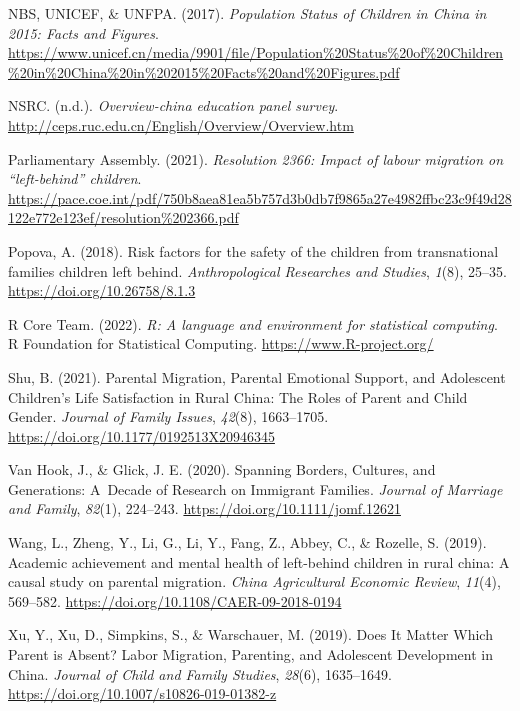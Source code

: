 \documentclass[
  man,floatsintext]{apa7}
\newlength{\cslhangindent}
\newlength{\cslentryspacingunit} %
\newenvironment{CSLReferences}[2] %
 {%
  \setlength{\parindent}{0pt}
  \ifodd #1
  \let\oldpar\par
  \def\par{\hangindent=\cslhangindent\oldpar}
  \fi
  \setlength{\parskip}{#2\cslentryspacingunit}
 }%
 {}
\begin{document}
\begin{CSLReferences}{1}{0}
\leavevmode{}%
NBS, UNICEF, \& UNFPA. (2017). \emph{Population Status of Children in China in 2015: Facts and Figures}. \url{https://www.unicef.cn/media/9901/file/Population\%20Status\%20of\%20Children\%20in\%20China\%20in\%202015\%20Facts\%20and\%20Figures.pdf}

\leavevmode{}%
NSRC. (n.d.). \emph{Overview-china education panel survey}. \url{http://ceps.ruc.edu.cn/English/Overview/Overview.htm}

\leavevmode{}%
Parliamentary Assembly. (2021). \emph{Resolution 2366: Impact of labour migration on {``}left-behind{''} children}. \url{https://pace.coe.int/pdf/750b8aea81ea5b757d3b0db7f9865a27e4982ffbc23c9f49d28122e772e123ef/resolution\%202366.pdf}

\leavevmode{}%
Popova, A. (2018). Risk factors for the safety of the children from transnational families children left behind. \emph{Anthropological Researches and Studies}, \emph{1}(8), 25--35. \url{https://doi.org/10.26758/8.1.3}

\leavevmode{}%
R Core Team. (2022). \emph{R: A language and environment for statistical computing}. R Foundation for Statistical Computing. \url{https://www.R-project.org/}

\leavevmode{}%
Shu, B. (2021). Parental Migration, Parental Emotional Support, and Adolescent Children{'}s Life Satisfaction in Rural China: The Roles of Parent and Child Gender. \emph{Journal of Family Issues}, \emph{42}(8), 1663--1705. \url{https://doi.org/10.1177/0192513X20946345}

\leavevmode{}%
Van Hook, J., \& Glick, J. E. (2020). Spanning Borders, Cultures, and Generations: A~Decade of Research on Immigrant Families. \emph{Journal of Marriage and Family}, \emph{82}(1), 224--243. \url{https://doi.org/10.1111/jomf.12621}

\leavevmode{}%
Wang, L., Zheng, Y., Li, G., Li, Y., Fang, Z., Abbey, C., \& Rozelle, S. (2019). Academic achievement and mental health of left-behind children in rural china: A causal study on parental migration. \emph{China Agricultural Economic Review}, \emph{11}(4), 569--582. \url{https://doi.org/10.1108/CAER-09-2018-0194}

\leavevmode{}%
Xu, Y., Xu, D., Simpkins, S., \& Warschauer, M. (2019). Does It Matter Which Parent is Absent? Labor Migration, Parenting, and Adolescent Development in China. \emph{Journal of Child and Family Studies}, \emph{28}(6), 1635--1649. \url{https://doi.org/10.1007/s10826-019-01382-z}


\end{CSLReferences}
\end{document}
